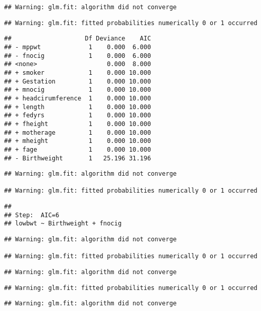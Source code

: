 \documentclass[]{article}
\begin{document}
\begin{verbatim}
## Warning: glm.fit: algorithm did not converge
\end{verbatim}

\begin{verbatim}
## Warning: glm.fit: fitted probabilities numerically 0 or 1 occurred
\end{verbatim}

\begin{verbatim}
##                    Df Deviance    AIC
## - mppwt             1    0.000  6.000
## - fnocig            1    0.000  6.000
## <none>                   0.000  8.000
## + smoker            1    0.000 10.000
## + Gestation         1    0.000 10.000
## + mnocig            1    0.000 10.000
## + headcirumference  1    0.000 10.000
## + length            1    0.000 10.000
## + fedyrs            1    0.000 10.000
## + fheight           1    0.000 10.000
## + motherage         1    0.000 10.000
## + mheight           1    0.000 10.000
## + fage              1    0.000 10.000
## - Birthweight       1   25.196 31.196
\end{verbatim}

\begin{verbatim}
## Warning: glm.fit: algorithm did not converge

## Warning: glm.fit: fitted probabilities numerically 0 or 1 occurred
\end{verbatim}

\begin{verbatim}
## 
## Step:  AIC=6
## lowbwt ~ Birthweight + fnocig
\end{verbatim}

\begin{verbatim}
## Warning: glm.fit: algorithm did not converge

## Warning: glm.fit: fitted probabilities numerically 0 or 1 occurred
\end{verbatim}

\begin{verbatim}
## Warning: glm.fit: algorithm did not converge
\end{verbatim}

\begin{verbatim}
## Warning: glm.fit: fitted probabilities numerically 0 or 1 occurred
\end{verbatim}

\begin{verbatim}
## Warning: glm.fit: algorithm did not converge
\end{verbatim}
\end{document}
